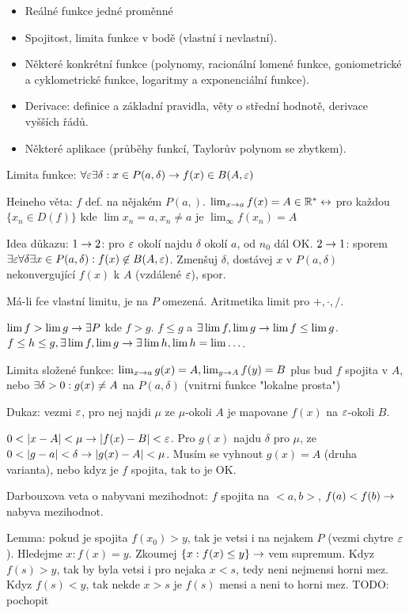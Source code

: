 \begin{itemize}
\item Reálné funkce jedné proměnné
\item Spojitost, limita funkce v bodě (vlastní i nevlastní).
\item Některé konkrétní funkce (polynomy, racionální lomené funkce, goniometrické a cyklometrické funkce, logaritmy a exponenciální funkce).
\item Derivace: definice a základní pravidla, věty o střední hodnotě, derivace vyšších řádů.
\item Některé aplikace (průběhy funkcí, Taylorův polynom se zbytkem).
\end{itemize}

Limita funkce: $\forall\varepsilon\exists\delta:x\in P(a,\delta)\rightarrow f(x)\in B(A,\varepsilon)$

Heineho věta: $f$ def. na nějakém $P(a,)$. $\lim_{x\rightarrow a}f(x)=A\in\mathbb{R}^*
\leftrightarrow$ pro každou $\{x_n\in D(f)\}$ kde $\lim x_n=a,x_n\neq a$
je $\lim_{\infty}f(x_n)=A$

Idea důkazu: $1\rightarrow 2$: pro $\varepsilon$ okolí najdu $\delta$ okolí $a$, od $n_0$ dál
OK. $2\rightarrow 1$: sporem $\exists\varepsilon\forall\delta\exists x\in P(a,\delta): f(x)\not\in
B(A,\varepsilon)$. Zmenšuj $\delta$, dostávej $x$ v $P(a,\delta)$ nekonvergující
$f(x)$ k $A$ (vzdálené $\varepsilon$), spor.

Má-li fce vlastní limitu, je na $P$ omezená.
Aritmetika limit pro $+,\cdot,/$.

$\lim f>\lim g\rightarrow\exists P$ kde $f>g$.
$f\leq g$ a $\exists\lim f,\lim g \rightarrow \lim f\leq\lim g$.
$f\leq h\leq g, \exists\lim f,\lim g\rightarrow\exists\lim h, \lim h=\lim\ldots$.

Limita složené funkce: $\lim_{x\rightarrow a}g(x)=A, \lim_{y\rightarrow A}f(y)=B$
plus bud $f$ spojita v $A$, nebo $\exists\delta>0: g(x)\neq A$ na $P(a,\delta)$
(vnitrni funkce "lokalne prosta")

Dukaz: vezmi $\varepsilon$, pro nej najdi $\mu$ ze $\mu$-okoli $A$ je mapovane
$f(x)$ na $\varepsilon$-okoli $B$.

$0<|x-A|<\mu \imp |f(x)-B|<\eps$. Pro $g(x)$ najdu $\delta$ pro $\mu$, ze
$0<|g-a|<\delta\imp |g(x)-A|<\mu$. Musím se vyhnout $g(x)=A$ (druha
varianta), nebo kdyz je $f$ spojita, tak to je OK.

Darbouxova veta o nabyvani mezihodnot: $f$ spojita na $<a,b>$, $f(a)<f(b)
\rightarrow$ nabyva mezihodnot.

Lemma: pokud je spojita $f(x_0)>y$, tak je vetsi i na nejakem $P$
(vezmi chytre $\varepsilon$).
Hledejme $x:f(x)=y$. Zkoumej $\{x:f(x)\leq y\}\rightarrow$ vem supremum.
Kdyz $f(s)>y$, tak by byla vetsi i pro nejaka $x<s$, tedy neni nejmensi horni
mez. Kdyz $f(s)<y$, tak nekde $x>s$ je $f(s)$ mensi a neni to horni mez.
TODO: pochopit

